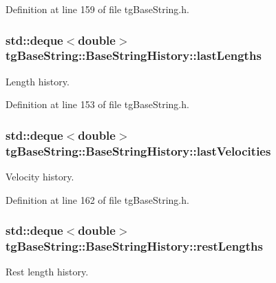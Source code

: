 Definition at line 159 of file tg\-Base\-String.\-h.

\hypertarget{structtg_base_string_1_1_base_string_history_a9cb214114d51a5c43bbe820b0ebea690}{
\subsubsection[{last\-Lengths}]{\setlength{\rightskip}{0pt plus 5cm}std\-::deque$<$double$>$ tg\-Base\-String\-::\-Base\-String\-History\-::last\-Lengths}}\label{structtg_base_string_1_1_base_string_history_a9cb214114d51a5c43bbe820b0ebea690}
Length history. 

Definition at line 153 of file tg\-Base\-String.\-h.

\hypertarget{structtg_base_string_1_1_base_string_history_ae084154b0fccaafadeacf1f246f22115}{
\subsubsection[{last\-Velocities}]{\setlength{\rightskip}{0pt plus 5cm}std\-::deque$<$double$>$ tg\-Base\-String\-::\-Base\-String\-History\-::last\-Velocities}}\label{structtg_base_string_1_1_base_string_history_ae084154b0fccaafadeacf1f246f22115}
Velocity history. 

Definition at line 162 of file tg\-Base\-String.\-h.

\hypertarget{structtg_base_string_1_1_base_string_history_aba048e0d7ddad106779a8f76fe8ccb0e}{
\subsubsection[{rest\-Lengths}]{\setlength{\rightskip}{0pt plus 5cm}std\-::deque$<$double$>$ tg\-Base\-String\-::\-Base\-String\-History\-::rest\-Lengths}}\label{structtg_base_string_1_1_base_string_history_aba048e0d7ddad106779a8f76fe8ccb0e}
Rest length history. 

